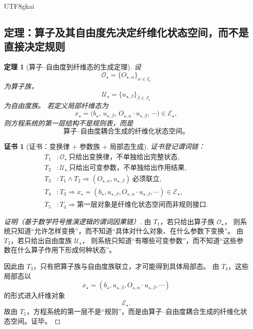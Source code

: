 \documentclass[12pt]{article}
\newtheorem{theorem}{定理}[section]
\newtheorem{Certificate}{证书}[section]
\begin{document}
\begin{CJK*}{UTF8}{gkai}
\subsection{定理：算子及其自由度先决定纤维化状态空间，而不是直接决定规则}
\label{subsec:tex37-ch12-thm1}

\begin{theorem}[算子--自由度到纤维态的生成定理]
\label{thm:tex37-ch12-operators}
设
\[
  \mathcal O_\star=\{O_{\star,\alpha}\}_{\alpha\in I_\star}
\]
为算子族，
\[
  \mathcal U_\star=\{u_{\star,\beta}\}_{\beta\in J_\star}
\]
为自由度族。
若定义局部纤维态为
\[
  x_\star=
  \bigl(
    b_\star,\,
    u_{\star,\beta},\,
    O_{\star,\alpha}\cdot u_{\star,\beta},\,
    \cdots
  \bigr)
  \in \mathcal E_\star,
\]
则方程系统的第一层结构不是规则表，而是
\[
  \boxed{
    \text{算子--自由度耦合生成的纤维化状态空间。}
  }
\]
\end{theorem}

\begin{Certificate}[证书：变换律 + 参数族 + 局部态生成]
\label{cert:tex37-ch12-operators}
证书登记谓词链：
\[
\begin{aligned}
  T_1 &: \mathcal O_\star\ \text{只给出变换律，不单独给出完整状态},\\
  T_2 &: \mathcal U_\star\ \text{只给出可变参数，不单独给出作用结果},\\
  T_3 &: T_1\wedge T_2\Rightarrow
  (O_{\star,\alpha},u_{\star,\beta})\ \text{必须联立},\\
  T_4 &: T_3\Rightarrow x_\star=
  (b_\star,u_{\star,\beta},O_{\star,\alpha}\cdot u_{\star,\beta},\cdots)\in\mathcal E_\star,\\
  T_5 &: T_4\Rightarrow \text{第一层对象是纤维化状态空间而非规则接口}.
\end{aligned}
\]
\end{Certificate}

\begin{proof}[证明（基于数学符号推演逻辑的谓词因果链）]
由 $T_1$，若只给出算子族 $\mathcal O_\star$，
则系统只知道“允许怎样变换”，而不知道“具体对什么对象、在什么参数下变换”。
由 $T_2$，若只给出自由度族 $\mathcal U_\star$，
则系统只知道“有哪些可变参数”，而不知道“这些参数在什么算子作用下形成何种状态”。

因此由 $T_3$，只有把算子族与自由度族联立，才可能得到具体局部态。
由 $T_4$，这些局部态以
\[
  x_\star=
  (b_\star,u_{\star,\beta},O_{\star,\alpha}\cdot u_{\star,\beta},\cdots)
\]
的形式进入纤维对象
\[
  \mathcal E_\star.
\]
故由 $T_5$，方程系统的第一层不是“规则”，而是由算子--自由度耦合生成的纤维化状态空间。证毕。
\end{proof}


\end{CJK*}
\end{document}

